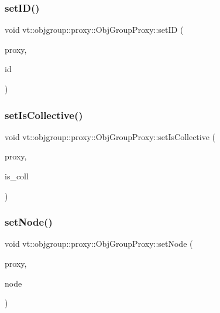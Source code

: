 \subsubsection{\texorpdfstring{set\+I\+D()}{setID()}}
{\footnotesize\ttfamily void vt\+::objgroup\+::proxy\+::\+Obj\+Group\+Proxy\+::set\+ID (\begin{DoxyParamCaption}\item[{\hyperlink{namespacevt_ad7cae989df485fccca57f0792a880a8e}{Obj\+Group\+Proxy\+Type} \&}]{proxy,  }\item[{\hyperlink{namespacevt_1_1objgroup_a54a50ff6833bf618e5bedb9a3b6d0e07}{Obj\+Group\+I\+D\+Type}}]{id }\end{DoxyParamCaption})\hspace{0.3cm}{\ttfamily [static]}}

\mbox{\label{structvt_1_1objgroup_1_1proxy_1_1_obj_group_proxy_a5a4ff4e167d511dd0265bc4370d2389c}} 
\subsubsection{\texorpdfstring{set\+Is\+Collective()}{setIsCollective()}}
{\footnotesize\ttfamily void vt\+::objgroup\+::proxy\+::\+Obj\+Group\+Proxy\+::set\+Is\+Collective (\begin{DoxyParamCaption}\item[{\hyperlink{namespacevt_ad7cae989df485fccca57f0792a880a8e}{Obj\+Group\+Proxy\+Type} \&}]{proxy,  }\item[{bool}]{is\+\_\+coll }\end{DoxyParamCaption})\hspace{0.3cm}{\ttfamily [static]}}

\mbox{\label{structvt_1_1objgroup_1_1proxy_1_1_obj_group_proxy_a8df9357e3939df4abbd816b94b3fef32}} 
\subsubsection{\texorpdfstring{set\+Node()}{setNode()}}
{\footnotesize\ttfamily void vt\+::objgroup\+::proxy\+::\+Obj\+Group\+Proxy\+::set\+Node (\begin{DoxyParamCaption}\item[{\hyperlink{namespacevt_ad7cae989df485fccca57f0792a880a8e}{Obj\+Group\+Proxy\+Type} \&}]{proxy,  }\item[{\hyperlink{namespacevt_a866da9d0efc19c0a1ce79e9e492f47e2}{Node\+Type} const \&}]{node }\end{DoxyParamCaption})\hspace{0.3cm}{\ttfamily [static]}}

